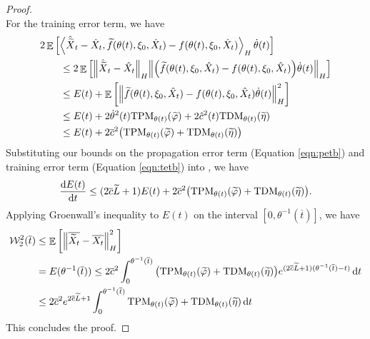 \begin{proof}
\begin{equation}
  \end{equation}
  For the training error term, we have
  \begin{align}
    &2 \mathop{\mathbb{E}}\qty[\ev{ \hat{\widetilde{X}}_{t} - \hat{X}_{t}, \widetilde{f}(\theta(t), \xi_{0}, \hat{X}_{t})  - f(\theta(t), \xi_{0}, \hat{X}_{t})}_{H} \dot{\theta}(t)] \notag \\
    &\qquad \leq 2 \mathop{\mathbb{E}}\qty[\norm{ \hat{\widetilde{X}}_{t} - \hat{X}_{t}}_{H} \norm{ \qty(\widetilde{f}(\theta(t), \xi_{0}, \hat{X}_{t}) - f(\theta(t), \xi_{0}, \hat{X}_{t})) \dot{\theta}(t)}_{H}]\notag \\
    &\qquad \leq E(t) + \mathop{\mathbb{E}}\qty[\norm{ \widetilde{f}(\theta(t), \xi_{0}, \hat{X}_{t}) - f(\theta(t), \xi_{0}, \hat{X}_{t}) \dot{\theta}(t)}^{2}_{H}] \notag \\
    &\qquad \leq E(t) + 2 \dot{\theta}^{2}(t) \mathrm{TPM}_{\theta(t)}( \widetilde{\varphi}) + 2 \hat{c}^{2}(t) \mathrm{TDM}_{\theta(t)}(\widetilde{\eta}) \notag \\
    &\qquad \leq E(t) + 2 \overline{c}^{2}\qty( \mathrm{TPM}_{\theta(t)}(\widetilde{\varphi}) + \mathrm{TDM}_{\theta(t)}(\widetilde{\eta})) \label{eqn:tetb}
  \end{align}
  Substituting our bounds on the propagation error term (Equation \ref{eqn:petb}) and training error term (Equation \ref{eqn:tetb}) into , we have
  \[
    \dv{E(t)}{t}  \leq (2\overline{c} \widetilde{L} + 1) E(t) + 2\overline{c}^{2} \qty( \mathrm{TPM}_{\theta(t)}(  \widetilde{\varphi}) + \mathrm{TDM}_{\theta(t)} ( \widetilde{\eta})).
  \]
  Applying Groenwall's inequality to \(E(t)\) on the interval \([0, \theta^{-1}(\overline{t})]\), we have
  \begin{align*}
    \mathcal{W}^{2}_{2}(\overline{t}) &\leq \mathop{\mathbb{E}}\qty[ \norm{ \overline{\widetilde{X}_{t}} - \overline{X_{t}} }^{2}_{H} ] \\
    & = E(\theta^{-1}(\overline{t})) \leq 2 \overline{c}^{2} \int_{0}^{ \theta^{-1}(\overline{t})} \qty( \mathrm{TPM}_{\theta(t)}( \widetilde{\varphi} ) + \mathrm{TDM}_{\theta(t)} (\widetilde{\eta}) )e^{(2  \overline{c} \widetilde{L} + 1 )(\theta^{-1}(\overline{t}) - t) }\dd{t} \\
    &\leq 2\overline{c}^{2} e^{2 \overline{c} \widetilde{L} + 1} \int_{0}^{\theta^{-1}(\overline{t})} \mathrm{TPM}_{\theta(t)}(\widetilde{\varphi}) + \mathrm{TDM}_{\theta(t)}(\widetilde{\eta})\dd{t}
  \end{align*}
  This concludes the proof.
\end{proof}

